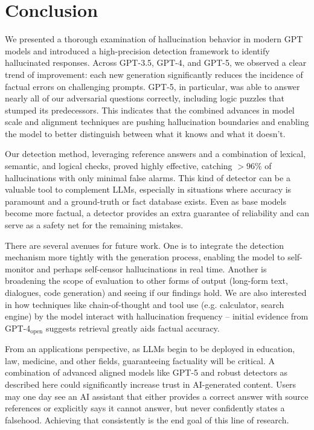 \documentclass{article}
\begin{document}
\section{Conclusion}\label{sec:conclusion}
We presented a thorough examination of hallucination behavior in modern GPT models and introduced a high-precision detection framework to identify hallucinated responses. Across GPT-3.5, GPT-4, and GPT-5, we observed a clear trend of improvement: each new generation significantly reduces the incidence of factual errors on challenging prompts. GPT-5, in particular, was able to answer nearly all of our adversarial questions correctly, including logic puzzles that stumped its predecessors. This indicates that the combined advances in model scale and alignment techniques are pushing hallucination boundaries and enabling the model to better distinguish between what it knows and what it doesn’t.

Our detection method, leveraging reference answers and a combination of lexical, semantic, and logical checks, proved highly effective, catching $>96\%$ of hallucinations with only minimal false alarms. This kind of detector can be a valuable tool to complement LLMs, especially in situations where accuracy is paramount and a ground-truth or fact database exists. Even as base models become more factual, a detector provides an extra guarantee of reliability and can serve as a safety net for the remaining mistakes.

There are several avenues for future work. One is to integrate the detection mechanism more tightly with the generation process, enabling the model to self-monitor and perhaps self-censor hallucinations in real time. Another is broadening the scope of evaluation to other forms of output (long-form text, dialogues, code generation) and seeing if our findings hold. We are also interested in how techniques like chain-of-thought and tool use (e.g. calculator, search engine) by the model interact with hallucination frequency -- initial evidence from GPT-4$_\text{open}$ suggests retrieval greatly aids factual accuracy.

From an applications perspective, as LLMs begin to be deployed in education, law, medicine, and other fields, guaranteeing factuality will be critical. A combination of advanced aligned models like GPT-5 and robust detectors as described here could significantly increase trust in AI-generated content. Users may one day see an AI assistant that either provides a correct answer with source references or explicitly says it cannot answer, but never confidently states a falsehood. Achieving that consistently is the end goal of this line of research.
\end{document}
